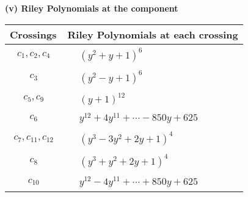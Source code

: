 \documentclass[1p]{elsarticle_modified}
\theoremstyle{definition}
\begin{document}
\newpage\renewcommand{\arraystretch}{1}
\flushleft \textbf{(v) Riley Polynomials at the component}\newline \\
\begin{tabular}{m{50pt}|m{274pt}}
Crossings & \hspace{64pt}Riley Polynomials at each crossing \\
\hline $$\begin{aligned}c_{1},c_{2},c_{4}\end{aligned}$$&$\begin{aligned}
&(y^2+y+1)^6
\end{aligned}$\\
\hline $$\begin{aligned}c_{3}\end{aligned}$$&$\begin{aligned}
&(y^2- y+1)^6
\end{aligned}$\\
\hline $$\begin{aligned}c_{5},c_{9}\end{aligned}$$&$\begin{aligned}
&(y+1)^{12}
\end{aligned}$\\
\hline $$\begin{aligned}c_{6}\end{aligned}$$&$\begin{aligned}
&y^{12}+4 y^{11}+\cdots-850 y+625
\end{aligned}$\\
\hline $$\begin{aligned}c_{7},c_{11},c_{12}\end{aligned}$$&$\begin{aligned}
&(y^3-3 y^2+2 y+1)^4
\end{aligned}$\\
\hline $$\begin{aligned}c_{8}\end{aligned}$$&$\begin{aligned}
&(y^3+y^2+2 y+1)^4
\end{aligned}$\\
\hline $$\begin{aligned}c_{10}\end{aligned}$$&$\begin{aligned}
&y^{12}-4 y^{11}+\cdots+850 y+625
\end{aligned}$\\
\hline
\end{tabular}\\~\\
\end{document}
